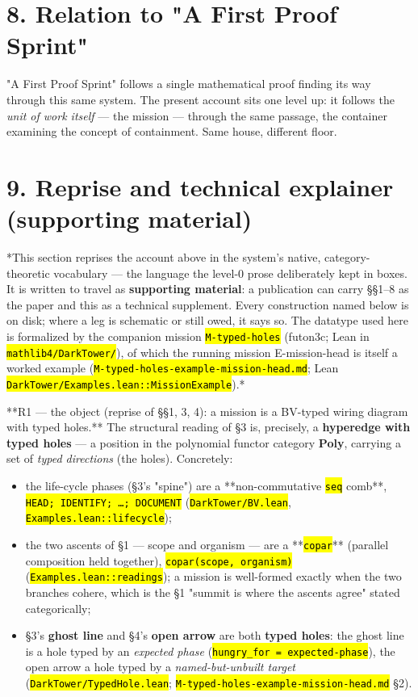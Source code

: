 \documentclass[11pt,oneside]{article}
\newcommand{\scopehl}[1]{\texttt{\hl{#1}}}
\begin{document}
\section*{8. Relation to "A First Proof Sprint"}

"A First Proof Sprint" follows a single mathematical proof finding its way
through this same system. The present account sits one level up: it follows
the \emph{unit of work itself} --- the mission --- through the same passage, the
container examining the concept of containment. Same house, different floor.

\section*{9. Reprise and technical explainer (supporting material)}

*This section reprises the account above in the system's native,
category-theoretic vocabulary --- the language the level-0 prose deliberately kept
in boxes. It is written to travel as \textbf{supporting material}: a publication can
carry \S{}\S{}1--8 as the paper and this as a technical supplement. Every construction
named below is on disk; where a leg is schematic or still owed, it says so. The
datatype used here is formalized by the companion mission \scopehl{M-typed-holes}
(futon3c; Lean in \scopehl{mathlib4/DarkTower/}), of which the running mission
E-mission-head is itself a worked example (\scopehl{M-typed-holes-example-mission-head.md};
Lean \scopehl{DarkTower/Examples.lean::MissionExample}).*

**R1 --- the object (reprise of \S{}\S{}1, 3, 4): a mission is a BV-typed wiring
diagram with typed holes.** The structural reading of \S{}3 is, precisely, a
\textbf{hyperedge with typed holes} --- a position in the polynomial functor category
\textbf{Poly}, carrying a set of \emph{typed directions} (the holes). Concretely:

\begin{itemize}[leftmargin=1.3em,itemsep=1pt]
\item the life-cycle phases (\S{}3's "spine") are a **non-commutative \scopehl{seq} comb**, \scopehl{HEAD; IDENTIFY; \ldots{}; DOCUMENT} (\scopehl{DarkTower/BV.lean}, \scopehl{Examples.lean::lifecycle});
\item the two ascents of \S{}1 --- scope and organism --- are a **\scopehl{copar}** (parallel composition held together), \scopehl{copar(scope, organism)} (\scopehl{Examples.lean::readings}); a mission is well-formed exactly when the two branches cohere, which is the \S{}1 "summit is where the ascents agree" stated categorically;
\item \S{}3's \textbf{ghost line} and \S{}4's \textbf{open arrow} are both \textbf{typed holes}: the ghost line is a hole typed by an \emph{expected phase} (\scopehl{hungry\_for = expected-phase}), the open arrow a hole typed by a \emph{named-but-unbuilt target} (\scopehl{DarkTower/TypedHole.lean}; \scopehl{M-typed-holes-example-mission-head.md} \S{}2).
\end{itemize}
\end{document}
